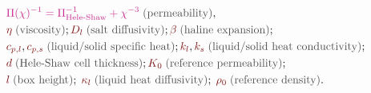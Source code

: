 \documentclass[landscape,24pt, a0paper,colspace=10mm,blockverticalspace=12mm]{tikzposter}
\newcommand{\eqnColor}[1]{\textcolor{royalfuchsia}{#1}}
\newcommand{\paramColor}[1]{\textcolor{falured}{#1}}
\newcommand{\varLabel}[1]{\textcolor{eqnLabelGray}{\text{#1}}}
\begin{document}
\begin{columns}
\begin{subcolumns}
{\begin{minipage}[t]{0.4\linewidth}
\begin{align*}
&\eqnColor{\Pi(\chi)^{-1} = \Pi_\text{Hele-Shaw}^{-1} + \chi^{-3}} \; \varLabel{(permeability)}, \\
&\paramColor{\eta} \; \varLabel{(viscosity)}; \paramColor{D_l} \; \varLabel{(salt diffusivity)};\paramColor{\beta} \; \varLabel{(haline expansion)}; \\
&\paramColor{c_{p,l}}, \paramColor{c_{p,s}} \; \varLabel{(liquid/solid specific heat)}; \paramColor{k_l}, \paramColor{k_s} \; \varLabel{(liquid/solid heat conductivity)}; \\
&\paramColor{d} \; \varLabel{(Hele-Shaw cell thickness)}; \paramColor{K_0} \; \varLabel{(reference permeability)}; \\
&\paramColor{l} \; \varLabel{(box height)}; \; \paramColor{\kappa_l} \; \varLabel{(liquid heat diffusivity)}; \; \paramColor{\rho_0} \; \varLabel{(reference density)}.
\end{align*}
\vspace{-1.9em}
\end{minipage}


}
\end{subcolumns}
\end{columns}
\end{document}
